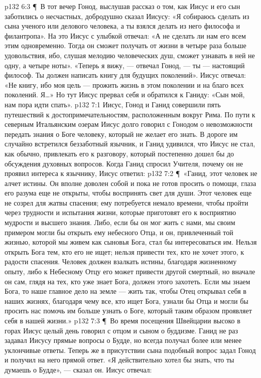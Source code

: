 \vs p132 6:3 \P\ В тот вечер Гонод, выслушав рассказ о том, как Иисус и его сын заботились о несчастных, добродушно сказал Иисусу: «Я собираюсь сделать из сына ученого или делового человека, а ты взялся делать из него философа и филантропа». На это Иисус с улыбкой отвечал: «А не сделать ли нам его всем этим одновременно. Тогда он сможет получать от жизни в четыре раза больше удовольствия, ибо, слушая мелодию человеческих душ, сможет узнавать в ней не одну, а четыре ноты». «Теперь я вижу, --- отвечал Гонод, --- ты --- настоящий философ. Ты должен написать книгу для будущих поколений». Иисус отвечал: «Не книгу, ибо моя цель --- прожить жизнь в этом поколении и на благо всех поколений. Я\ldots » Но тут Иисус прервал себя и обратился к Ганиду: «Сын мой, нам пора идти спать».
\vs p132 7:1 Иисус, Гонод и Ганид совершили пять путешествий к достопримечательностям, расположенным вокруг Рима. По пути к северным Итальянским озерам Иисус долго говорил с Гонодом о невозможности передать знания о Боге человеку, который не желает его знать. В дороге им случайно встретился беззаботный язычник, и Ганид удивился, что Иисус не стал, как обычно, привлекать его к разговору, который постепенно дошел бы до обсуждения духовных вопросов. Когда Ганид спросил Учителя, почему он не проявил интереса к язычнику, Иисус ответил:
\vs p132 7:2 \P\ «Ганид, этот человек не алчет истины. Он вполне доволен собой и пока не готов просить о помощи, глаза его разума еще не открыты, чтобы воспринять свет для души. Этот человек еще не созрел для жатвы спасения; ему потребуется немало времени, чтобы пройти через трудности и испытания жизни, которые приготовят его к восприятию мудрости и высшего знания. Либо, если бы он мог жить с нами, мы своим примером могли бы открыть ему небесного Отца, и он, привлеченный той жизнью, которой мы живем как сыновья Бога, стал бы интересоваться им. Нельзя открыть Бога тем, кто его не ищет; нельзя привести тех, кто не хочет этого, к радости спасения. Человек должен взалкать истины, благодаря жизненному опыту, либо к Небесному Отцу его может привести другой смертный, но вначале он сам, глядя на тех, кто уже знает Бога, должен этого захотеть. Если мы знаем Бога, то наше главное дело на земле --- жить так, чтобы Отец открывал себя в наших жизнях, благодаря чему все, кто ищет Бога, узнали бы Отца и могли бы просить нас помочь им больше узнать о Боге, который таким образом проявляет себя в нашей жизни.»
\vs p132 7:3 \P\ Во время посещения Швейцарии высоко в горах Иисус целый день говорил с отцом и сыном о буддизме. Ганид не раз задавал Иисусу прямые вопросы о Будде, но всегда получал более или менее уклончивые ответы. Теперь же в присутствии сына подобный вопрос задал Гонод и получил на него прямой ответ. «Я действительно хотел бы знать, что ты думаешь о Будде», --- сказал он. Иисус отвечал:
